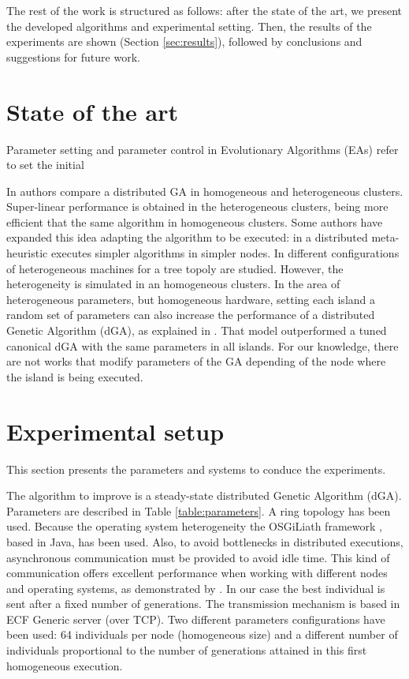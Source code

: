 \documentclass{sig-alternate}
\begin{document}
The rest of the work is structured as follows: after the state of
the art, we present the developed algorithms and experimental setting. 
Then, the results of the experiments are shown (Section \ref{sec:results}), followed by conclusions and suggestions for future work.


%
\section{State of the art}
\label{sec:soa}
%

Parameter setting and parameter control in Evolutionary Algorithms (EAs) refer to set the initial 

 In \cite{HETEROGENEOUSHARD} authors compare a distributed GA in homogeneous and heterogeneous clusters. Super-linear performance is obtained in the heterogeneous clusters, being more efficient that the same algorithm in homogeneous clusters. Some authors have expanded this idea adapting the algorithm to be executed: in \cite{HYDROCM} a distributed meta-heuristic executes simpler algorithms in simpler nodes. In \cite{HETEROTOPOLOGY} different configurations of heterogeneous machines for a tree topoly are studied. However, the heterogeneity is simulated in an homogeneous clusters. In the area of heterogeneous parameters, but homogeneous hardware, setting each island a random set of parameters can also increase the performance of a distributed Genetic Algorithm (dGA), as explained in \cite{RANDOMPARAMETERS}. That model outperformed a tuned canonical dGA with the same parameters in all islands. For our knowledge, there are not works that modify parameters of the GA depending of the node where the island is being executed.


\section{Experimental setup}
\label{subsec:experiments}
This section presents the parameters and systems to conduce the experiments.

The algorithm to improve is a steady-state distributed Genetic Algorithm (dGA). Parameters are described in Table \ref{table:parameters}. A ring topology has been used. Because the operating system heterogeneity the OSGiLiath framework \cite{OSGILIATH}, based in Java, has been used. Also, to avoid bottlenecks in distributed executions, asynchronous communication must be provided to avoid idle time. This kind of communication offers excellent performance when working with different nodes and operating systems, as demonstrated by \cite{HETEROGENEOUSHARD}. In our case the best individual is sent after a fixed number of generations. The transmission mechanism is based in ECF Generic server (over TCP). Two different parameters configurations have been used: 64 individuals per node (homogeneous size) and a different number of individuals proportional to the number of generations attained in this first homogeneous execution.
\end{document}
